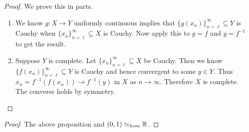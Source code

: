 \documentclass{report}
\begin{document}
\begin{proof}
We prove this in parts.
    \begin{enumerate}
        \item We know $g: X \to Y$ uniformly continuous implies that $\{g(x_n)\}_{n = \ell}^\infty \subseteq Y$ is Cauchy when $\{x_n\}_{n = \ell}^\infty \subseteq X$ is Cauchy. Now apply this to $g = f$ and $g = f^{-1}$ to get the result.
        \item Suppose $Y$ is complete. Let $\{x_n\}_{n = \ell}^\infty \subseteq X$ be Cauchy. Then we know $\{f(x_n)\}_{n = \ell}^\infty \subseteq Y$ is Cauchy and hence convergent to some $y \in Y$. Thus $x_n = f^{-1}(f(x_n)) \to f^{-1}(y)$ in $X$ as $n \to \infty$. Therefore $X$ is complete. The converse holds by symmetry. 
    \end{enumerate}
\end{proof}

\begin{proof}
    The above proposition and $(0,1) \simeq_{hom} \RR$.
\end{proof}

\newpage
\end{document}
